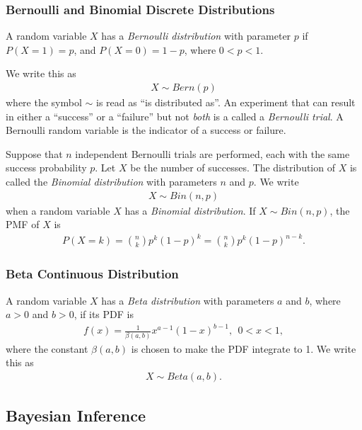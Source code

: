\documentclass[11pt,a4paper]{article}
\begin{document}

\subsubsection{Bernoulli and Binomial Discrete Distributions}

A random variable \(X\) has a \emph{Bernoulli distribution} 
with parameter \(p\) if \(P(X = 1) = p\), 
and \(P(X = 0) = 1 - p\), 
where \(0 < p < 1\).

We write this as
\begin{align}
X \sim Bern(p)
\end{align}
where the symbol \(\sim\) is read as ``is distributed as''. 
An experiment that can result in either 
a ``success'' or a ``failure'' but not \emph{both} 
is a called a \emph{Bernoulli trial}. 
A Bernoulli random variable is the indicator of a success or failure.

Suppose that \(n\) independent Bernoulli trials are performed, 
each with the same success probability \(p\). 
Let \(X\) be the number of successes. 
The distribution of \(X\) is called the \emph{Binomial distribution} 
with parameters \(n\) and \(p\). 
We write
\begin{align}
X \sim Bin(n,p)
\end{align}
when a random variable \(X\) has a \emph{Binomial distribution}. 
If \(X \sim Bin(n,p)\), 
the PMF of \(X\) is
\begin{align}
P(X = k) = \binom{n}{k}p^{k}(1 - p)^{k} = 
\binom{n}{k}p^{k}(1 - p)^{n - k}.
\end{align}

\subsubsection{Beta Continuous Distribution}

A random variable \(X\) has a \emph{Beta distribution} with parameters \(a\) and \(b\), 
where \(a > 0\) and \(b > 0\), 
if its PDF is
\begin{align}
f(x) = \frac{1}{\beta(a,b)}x^{a - 1}(1 - x)^{b - 1},\ \ 0 < x < 1,
\end{align}
where the constant \(\beta(a,b)\) is chosen to make the PDF integrate to 1. 
We write this as
\begin{align}
X \sim Beta(a,b).
\end{align}

\subsection{Bayesian Inference}
\end{document}
